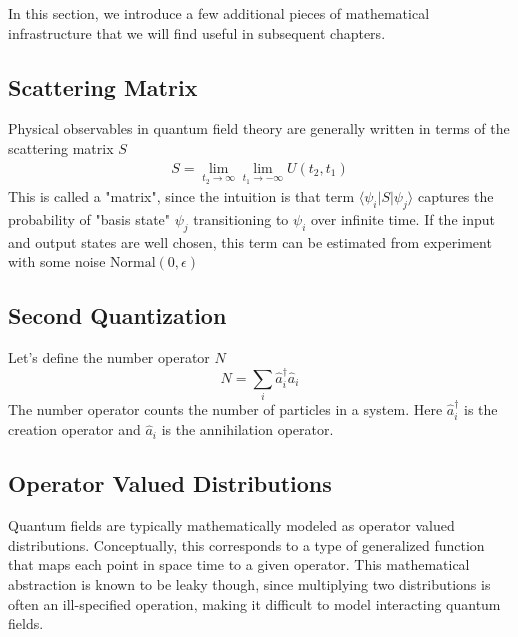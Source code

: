 \documentclass[book.tex]{subfiles}
\begin{document}
In this section, we introduce a few additional pieces of mathematical infrastructure that we will find useful in subsequent chapters.

\subsection{Scattering Matrix}
Physical observables in quantum field theory are generally written in terms of the scattering matrix $S$
\begin{align} S = \lim_{t_2 \to \infty} \lim_{t_1 \to -\infty} U(t_2, t_1) \end{align}
This is called a "matrix", since the intuition is that term $\langle \psi_i | S | \psi_j \rangle$ captures the probability of "basis state" $\psi_j$ transitioning to $\psi_i$ over infinite time. If the input and output states are well chosen, this term can be estimated from experiment with some noise $\textrm{Normal}(0, \epsilon)$
\subsection{Second Quantization}
Let's define the number operator $N$
\begin{equation} 
N = \sum_i \hat{a}_i^{\dagger} \hat{a}_i
\end{equation}
The number operator counts the number of particles in a system. Here $\hat{a}_i^\dagger$ is the creation operator and $\hat{a}_i$ is the annihilation operator. 

\subsection{Operator Valued Distributions}
Quantum fields are typically mathematically modeled as operator valued distributions. Conceptually, this corresponds to a type of generalized function that maps each point in space time to a given operator. This mathematical abstraction is known to be leaky though, since multiplying two distributions is often an ill-specified operation, making it difficult to model interacting quantum fields.
\end{document}
